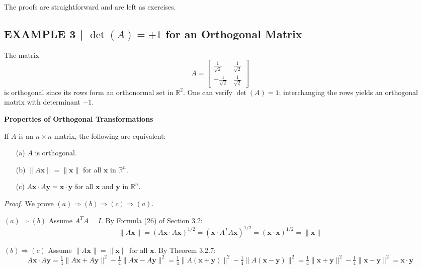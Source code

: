 \documentclass{article}
\newcommand{\redheading}[1]{{\vspace{2mm}\noindent\Large\bfseries\color{red!55!black} #1\par}\vspace{2mm}}
\theoremstyle{mystyle}
\begin{document}
The proofs are straightforward and are left as exercises.

\subsection*{EXAMPLE 3 | $\det(A)=\pm1$ for an Orthogonal Matrix}

The matrix
\[
  A = \begin{bmatrix} \tfrac{1}{\sqrt{2}} & \tfrac{1}{\sqrt{2}}\\[4pt]
                     -\tfrac{1}{\sqrt{2}} & \tfrac{1}{\sqrt{2}} \end{bmatrix}
\]
is orthogonal since its rows form an orthonormal set in $\mathbb{R}^2$.
One can verify $\det(A)=1$; interchanging the rows yields an orthogonal matrix with determinant $-1$.

\redheading{Properties of Orthogonal Transformations}

\begin{tcolorbox}[colback=red!4, colframe=red!60!black,
  title={\textbf{Theorem 7.1.3}}, boxrule=0.5mm, arc=3mm]
If $A$ is an $n\times n$ matrix, the following are equivalent:
\begin{enumerate}
  \item[(a)] $A$ is orthogonal.
  \item[(b)] $\|A\mathbf{x}\| = \|\mathbf{x}\|$ for all $\mathbf{x}$ in $\mathbb{R}^n$.
  \item[(c)] $A\mathbf{x}\cdot A\mathbf{y} = \mathbf{x}\cdot\mathbf{y}$ for all $\mathbf{x}$ and $\mathbf{y}$ in $\mathbb{R}^n$.
\end{enumerate}
\end{tcolorbox}

\textit{Proof.} We prove $(a)\Rightarrow(b)\Rightarrow(c)\Rightarrow(a)$.

\textbf{$(a)\Rightarrow(b)$} Assume $A^T A = I$. By Formula (26) of Section 3.2:
\[
  \|A\mathbf{x}\| = (A\mathbf{x}\cdot A\mathbf{x})^{1/2}
                  = (\mathbf{x}\cdot A^T A\mathbf{x})^{1/2}
                  = (\mathbf{x}\cdot\mathbf{x})^{1/2} = \|\mathbf{x}\|
\]

\textbf{$(b)\Rightarrow(c)$} Assume $\|A\mathbf{x}\|=\|\mathbf{x}\|$ for all $\mathbf{x}$. By Theorem 3.2.7:
\[
  A\mathbf{x}\cdot A\mathbf{y}
  = \tfrac{1}{4}\|A\mathbf{x}+A\mathbf{y}\|^2 - \tfrac{1}{4}\|A\mathbf{x}-A\mathbf{y}\|^2
  = \tfrac{1}{4}\|A(\mathbf{x}+\mathbf{y})\|^2 - \tfrac{1}{4}\|A(\mathbf{x}-\mathbf{y})\|^2
  = \tfrac{1}{4}\|\mathbf{x}+\mathbf{y}\|^2 - \tfrac{1}{4}\|\mathbf{x}-\mathbf{y}\|^2
  = \mathbf{x}\cdot\mathbf{y}
\]
\end{document}
